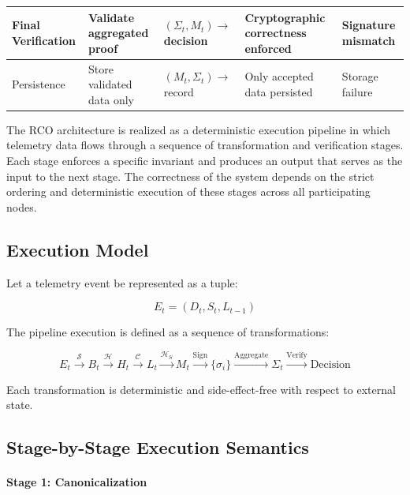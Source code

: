 \begin{table}[htbp]
\begin{tabularx}{\textwidth}{|p{2.3cm}|X|X|X|X|}
\hline

Final Verification & Validate aggregated proof & $(\Sigma_t, M_t) \rightarrow$ decision & Cryptographic correctness enforced & Signature mismatch \\

\hline

Persistence & Store validated data only & $(M_t, \Sigma_t) \rightarrow$ record & Only accepted data persisted & Storage failure \\

\hline

\end{tabularx}
\end{table}

The RCO architecture is realized as a deterministic execution pipeline in which telemetry data flows through a sequence of transformation and verification stages. Each stage enforces a specific invariant and produces an output that serves as the input to the next stage. The correctness of the system depends on the strict ordering and deterministic execution of these stages across all participating nodes.

\subsection{Execution Model}

Let a telemetry event be represented as a tuple:

\begin{equation}
E_t = (D_t, S_t, L_{t-1})
\end{equation}

The pipeline execution is defined as a sequence of transformations:

\begin{equation}
E_t \xrightarrow{\mathcal{S}} B_t \xrightarrow{\mathcal{H}} H_t \xrightarrow{\mathcal{C}} L_t \xrightarrow{\mathcal{H}_S} M_t \xrightarrow{\text{Sign}} \{\sigma_i\} \xrightarrow{\text{Aggregate}} \Sigma_t \xrightarrow{\text{Verify}} \text{Decision}
\end{equation}

Each transformation is deterministic and side-effect-free with respect to external state.

\subsection{Stage-by-Stage Execution Semantics}

\paragraph{Stage 1: Canonicalization}

